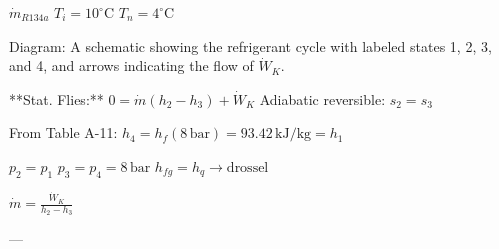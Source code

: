 \( \dot{m}_{R134a} \)  
\( T_i = 10^\circ \text{C} \)  
\( T_n = 4^\circ \text{C} \)  

Diagram: A schematic showing the refrigerant cycle with labeled states 1, 2, 3, and 4, and arrows indicating the flow of \( \dot{W}_K \).  

**Stat. Flies:**  
\( 0 = \dot{m} (h_2 - h_3) + \dot{W}_K \)  
Adiabatic reversible: \( s_2 = s_3 \)  

From Table A-11:  
\( h_4 = h_{f} (8 \, \text{bar}) = 93.42 \, \text{kJ/kg} = h_1 \)  

\( p_2 = p_1 \)  
\( p_3 = p_4 = 8 \, \text{bar} \)  
\( h_{fg} = h_q \rightarrow \text{drossel} \)  

\( \dot{m} = \frac{\dot{W}_K}{h_2 - h_3} \)  

---